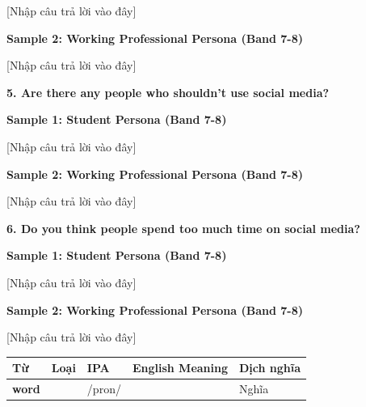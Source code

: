 [Nhập câu trả lời vào đây]

\textbf{Sample 2: Working Professional Persona (Band 7-8)}

[Nhập câu trả lời vào đây]

\separator

\begin{ieltsquestion}
\textbf{5. Are there any people who shouldn't use social media?}
\end{ieltsquestion}
\textbf{Sample 1: Student Persona (Band 7-8)}

[Nhập câu trả lời vào đây]

\textbf{Sample 2: Working Professional Persona (Band 7-8)}

[Nhập câu trả lời vào đây]

\separator

\begin{ieltsquestion}
\textbf{6. Do you think people spend too much time on social media?}
\end{ieltsquestion}
\textbf{Sample 1: Student Persona (Band 7-8)}

[Nhập câu trả lời vào đây]

\textbf{Sample 2: Working Professional Persona (Band 7-8)}

[Nhập câu trả lời vào đây]

\separator


\vspace{0.8em}
\begin{center}
\renewcommand{\arraystretch}{1.65}
\begin{tabularx}{\textwidth}{|V{0.22\textwidth}|C{0.07\textwidth}|I{0.20\textwidth}|Y|V{0.18\textwidth}|}
\hline
{}
\textbf{Từ} & \textbf{Loại} & \textbf{IPA} & \textbf{English Meaning} & \textbf{Dịch nghĩa} \\
\hline
\textbf{word} & & /pron/ & & Nghĩa \\ \hline
\end{tabularx}
\end{center}

\newpage

